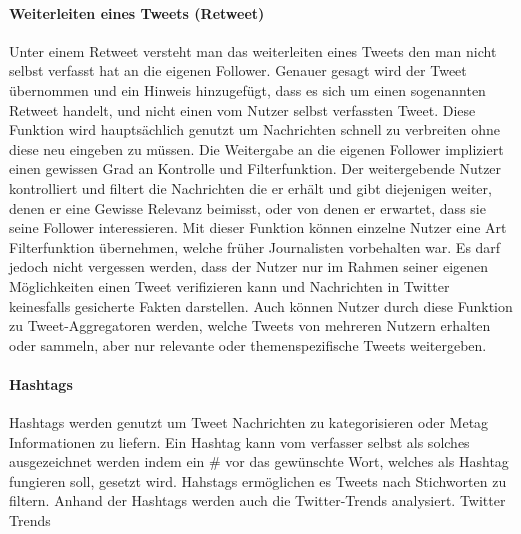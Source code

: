			\paragraph{Weiterleiten eines Tweets (Retweet)}
				Unter einem Retweet versteht man das weiterleiten eines Tweets den man nicht selbst verfasst hat an die eigenen Follower.
				Genauer gesagt wird der Tweet übernommen und ein Hinweis hinzugefügt, dass es sich um einen sogenannten Retweet handelt, und nicht einen vom Nutzer selbst verfassten Tweet.
				Diese Funktion wird hauptsächlich genutzt um Nachrichten schnell zu verbreiten ohne diese neu eingeben zu müssen. 
				Die Weitergabe an die eigenen Follower impliziert einen gewissen Grad an Kontrolle und Filterfunktion. 
				Der weitergebende Nutzer kontrolliert und filtert die Nachrichten die er erhält und gibt diejenigen weiter, denen er eine Gewisse Relevanz beimisst, oder von denen er erwartet, dass sie seine Follower interessieren. 
				Mit dieser Funktion können einzelne Nutzer eine Art Filterfunktion übernehmen, welche früher Journalisten vorbehalten war. 
				Es darf jedoch nicht vergessen werden, dass der Nutzer nur im Rahmen seiner eigenen Möglichkeiten einen Tweet verifizieren kann und Nachrichten in Twitter keinesfalls gesicherte Fakten darstellen.
				Auch können Nutzer durch diese Funktion zu Tweet-Aggregatoren werden, welche Tweets von mehreren Nutzern erhalten oder sammeln, aber nur relevante oder themenspezifische Tweets weitergeben.


			\paragraph{Hashtags}
				Hashtags werden genutzt um Tweet Nachrichten zu kategorisieren oder Metag Informationen zu liefern. 
				Ein Hashtag kann vom verfasser selbst als solches ausgezeichnet werden indem ein \# vor das gewünschte Wort, welches als Hashtag fungieren soll, gesetzt wird. 
				Hahstags ermöglichen es Tweets nach Stichworten zu filtern. 
				Anhand der Hashtags werden auch die Twitter-Trends analysiert.
				Twitter Trends 
				
